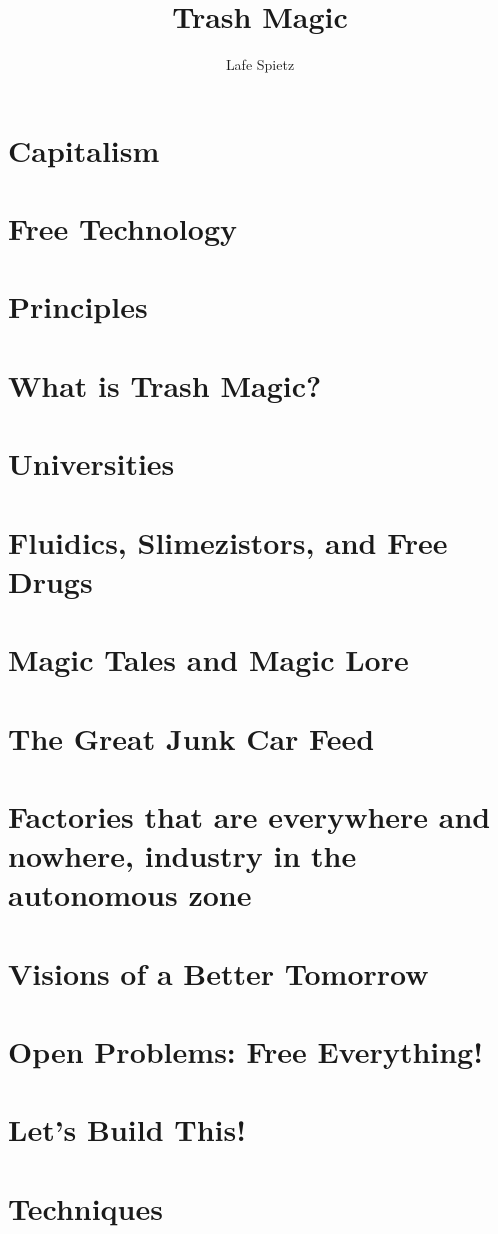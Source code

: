\documentclass[ebook,12pt,openany]{memoir} %
\title{Trash Magic}
\author{Lafe Spietz}
\begin{document}
\maketitle

\chapter{Capitalism}


\chapter{Free Technology}


\chapter{Principles}


\chapter{What is Trash Magic?}


\chapter{Universities}


\chapter{Fluidics, Slimezistors, and Free Drugs}


\chapter{Magic Tales and Magic Lore}


\chapter{The Great Junk Car Feed}


\chapter{Factories that are everywhere and nowhere, industry in the autonomous zone}


\chapter{Visions of a Better Tomorrow}


\chapter{Open Problems: Free Everything!}


\chapter{Let's Build This!}


\chapter{Techniques}

\end{document}
